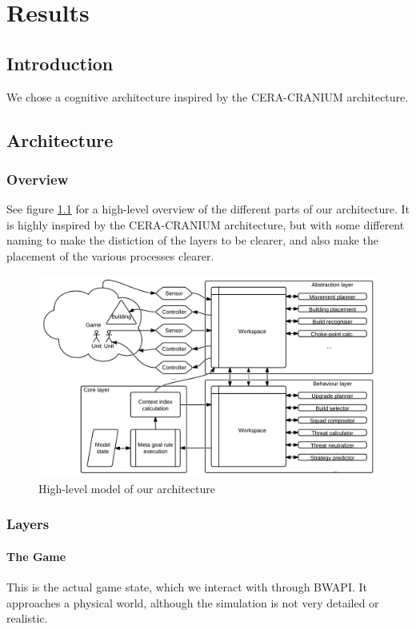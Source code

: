 \chapter{Results}

\section{Introduction}
We chose a cognitive architecture inspired by the CERA-CRANIUM architecture.

\section{Architecture}
\subsection{Overview}
See figure \ref{fig:our-architecture} for a high-level overview of the
different parts of our architecture. It is highly inspired by the CERA-CRANIUM
architecture, but with some different naming to make the distiction of the
layers to be clearer, and also make the placement of the various processes
clearer.


\begin{figure}[h!tb]
\centering
\includegraphics[scale=1.0]{graphics/our-architecture.png}
\caption{High-level model of our architecture}
\label{fig:our-architecture}
\end{figure}

\subsection{Layers}
\subsubsection{The Game}
This is the actual game state, which we interact with through BWAPI. It
approaches a physical world, although the simulation is not very detailed or
realistic.

